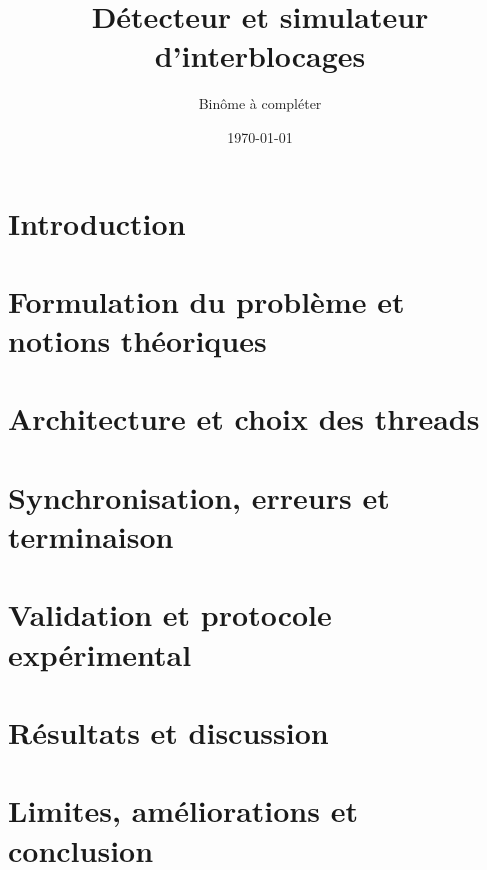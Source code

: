 \documentclass[12pt,a4paper]{report}
\title{Détecteur et simulateur d'interblocages}
\author{Binôme à compléter}
\date{\today}
\begin{document}
\maketitle
\tableofcontents
\chapter{Introduction}
\chapter{Formulation du problème et notions théoriques}
\chapter{Architecture et choix des threads}
\chapter{Synchronisation, erreurs et terminaison}
\chapter{Validation et protocole expérimental}
\chapter{Résultats et discussion}
\chapter{Limites, améliorations et conclusion}


\end{document}
